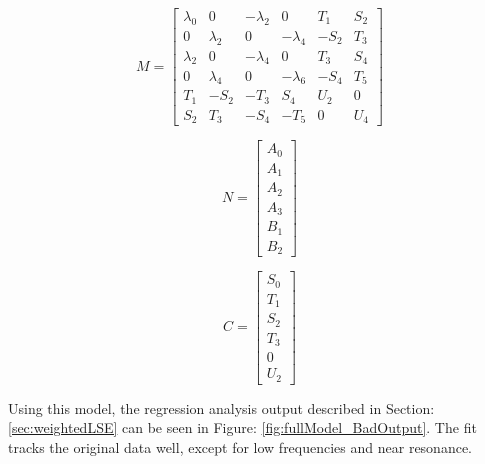 \begin{equation}
    \label{equ:fullModel_M}
    M = 
    \begin{bmatrix}
        \lambda _0 & 0          & -\lambda _2 & 0           &  T_1    & S_2 \\
        0          & \lambda _2 & 0           & -\lambda _4 & -S_2    & T_3 \\
        \lambda _2 & 0          & -\lambda _4 & 0           &  T_3    & S_4 \\
        0          & \lambda _4 & 0           & -\lambda _6 & -S_4    & T_5 \\
        T_1        & -S_2       & -T_3        &  S_4        &  U_2    & 0   \\
        S_2        &  T_3       & -S_4        & -T_5        &  0      & U_4
    \end{bmatrix}
\end{equation}

\begin{multicols}{2}
    \begin{equation}
        \label{equ:fullModel_N}
        N = 
        \begin{bmatrix}
            A_0 \\
            A_1 \\
            A_2 \\
            A_3 \\
            B_1 \\
            B_2
        \end{bmatrix}
    \end{equation}

    \begin{equation}
        \label{equ:fullModel_C}
        C = 
        \begin{bmatrix}
            S_0 \\
            T_1 \\
            S_2 \\
            T_3 \\
            0   \\
            U_2
        \end{bmatrix}
    \end{equation}
\end{multicols}

Using this model, the regression analysis output described in Section: \ref{sec:weightedLSE} can be seen in Figure: \ref{fig:fullModel_BadOutput}. The fit tracks the original data well, except for low frequencies and near resonance. 

